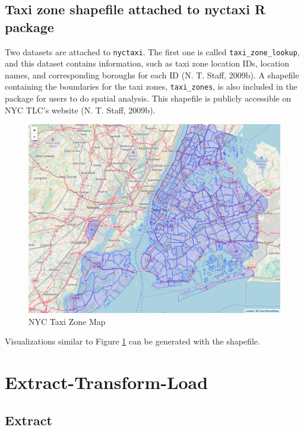 \documentclass[12pt,twoside]{reedthesis}
\theoremstyle{definition}
\theoremstyle{definition}
\theoremstyle{definition}
\theoremstyle{remark}
\begin{document}
\subsection{\texorpdfstring{Taxi zone shapefile attached to nyctaxi
\textbf{R}
package}{Taxi zone shapefile attached to nyctaxi R package}}\label{taxi-zone-shapefile-attached-to-nyctaxi-r-package}

Two datasets are attached to \texttt{nyctaxi}. The first one is called
\texttt{taxi\_zone\_lookup}, and this dataset contains information, such
as taxi zone location IDs, location names, and corresponding boroughs
for each ID (N. T. Staff, 2009b). A shapefile containing the boundaries
for the taxi zones, \texttt{taxi\_zones}, is also included in the
package for users to do spatial analysis. This shapefile is publicly
accessible on NYC TLC's website (N. T. Staff, 2009b).
\begin{figure}[h]

{\centering \includegraphics[width=5.84in]{figure/zonemap} 

}

\caption{NYC Taxi Zone Map}\label{fig:zonemap}
\end{figure}
Visualizations similar to Figure \ref{fig:zonemap} can be generated with
the shapefile.

\section{Extract-Transform-Load}\label{extract-transform-load}

\subsection{Extract}\label{extract}
\end{document}

